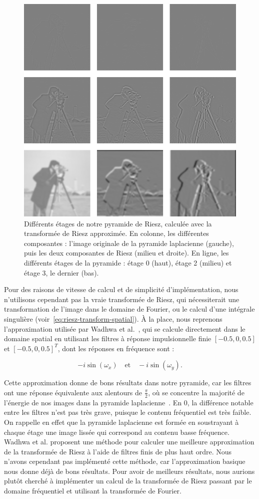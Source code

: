 \begin{figure}
    \centering
    \includegraphics[width=.65\textwidth]{contenu/resources/images/riesz_pyramid_cameraman}
    \caption[Pyramide de Riesz]{Différents étages de notre pyramide de Riesz, calculée avec la transformée de Riesz approximée. En colonne, les différentes composantes : l'image originale de la pyramide laplacienne (gauche), puis les deux composantes de Riesz (milieu et droite). En ligne, les différents étages de la pyramide : étage 0 (haut), étage 2 (milieu) et étage 3, le dernier (bas).}
    \label{fig:riesz-pyramid-cameraman}
\end{figure}

Pour des raisons de vitesse de calcul et de simplicité d'implémentation, nous n'utilisons cependant pas la vraie transformée de Riesz, qui nécessiterait une transformation de l'image dans le domaine de Fourier, ou le calcul d'une intégrale singulière (voir~\ref{eq:riesz-transform-spatial}). À la place, nous reprenons l'approximation utilisée par Wadhwa et al.~\cite{wadhwa_riesz_2014}, qui se calcule directement dans le domaine spatial en utilisant les filtres à réponse impulsionnelle finie $[-0.5, 0, 0.5]$ et $[-0.5, 0, 0.5]^T$, dont les réponses en fréquence sont :

\begin{equation}
    -i\sin(\omega_x) \quad \text{et} \quad -i\sin(\omega_y).
\end{equation}

Cette approximation donne de bons résultats dans notre pyramide, car les filtres ont une réponse équivalente aux alentours de $\frac\pi2$, où se concentre la majorité de l'énergie de nos images dans la pyramide laplacienne~\cite{wadhwa_riesz_2014}. En $0$, la différence notable entre les filtres n'est pas très grave, puisque le contenu fréquentiel est très faible. On rappelle en effet que la pyramide laplacienne est formée en soustrayant à chaque étage une image lissée qui correspond au contenu basse fréquence. Wadhwa et al. proposent une méthode pour calculer une meilleure approximation de la transformée de Riesz à l'aide de filtres finis de plus haut ordre. Nous n'avons cependant pas implémenté cette méthode, car l'approximation basique nous donne déjà de bons résultats. Pour avoir de meilleurs résultats, nous aurions plutôt cherché à implémenter un calcul de la transformée de Riesz passant par le domaine fréquentiel et utilisant la transformée de Fourier.

